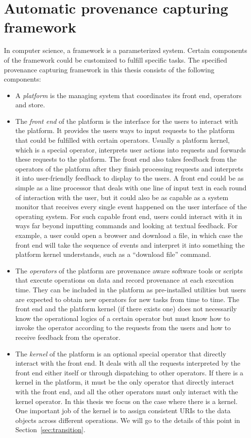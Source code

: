 \section{Automatic provenance capturing framework}
\label{sec:framework}
In computer science, a framework is a parameterized system. Certain components of the framework could be customized to fulfill specific tasks. The specified provenance capturing framework in this thesis consists of the following components:
\begin{itemize}
	\item A \emph{platform} is the managing system that coordinates its front end, operators and store. 
	\item The \emph{front end} of the platform is the interface for the users to interact with the platform. It provides the users ways to input requests to the platform that could be fulfilled with certain operators. Usually a platform kernel, which is a special operator, interprets user actions into requests and forwards these requests to the platform. The front end also takes feedback from the operators of the platform after they finish processing requests and interprets it into user-friendly feedback to display to the users. A front end could be as simple as a line processor that deals with one line of input text in each round of interaction with the user, but it could also be as capable as a system monitor that receives every single event happened on the user interface of the operating system. For such capable front end, users could interact with it in ways far beyond inputting commands and looking at textual feedback. For example, a user could open a browser and download a file, in which case the front end will take the sequence of events and interpret it into something the platform kernel understands, such as a ``download file'' command.
	\item The \emph{operators} of the platform are provenance aware software tools or scripts that execute operations on data and record provenance at each execution time. They can be included in the platform as pre-installed utilities but users are expected to obtain new operators for new tasks from time to time. The front end and the platform kernel (if there exists one) does not necessarily know the operational logics of a certain operator but must know how to invoke the operator according to the requests from the users and how to receive feedback from the operator.
	\item The \emph{kernel} of the platform is an optional special operator that directly interact with the front end. It deals with all the requests interpreted by the front end either itself or through dispatching to other operators. If there is a kernel in the platform, it must be the only operator that directly interact with the front end, and all the other operators must only interact with the kernel operator. In this thesis we focus on the case where there is a kernel. One important job of the kernel is to assign consistent URIs to the data objects across different operations. We will go to the details of this point in Section~\ref{sec:transition}.

\end{itemize}
